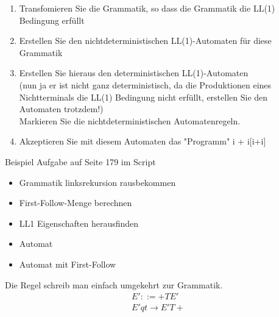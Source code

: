 \documentclass[
  ngerman
  ,12pt
  ,pdftex
]{article}
\begin{document}
\begin{enumerate}
  \item Transfomieren Sie die Grammatik, so dass die Grammatik die LL(1) Bedingung erfüllt
  \item Erstellen Sie den nichtdeterministischen LL(1)-Automaten für diese Grammatik
  \item Erstellen Sie hieraus den deterministischen LL(1)-Automaten\\ (nun ja er ist nicht ganz deterministisch, da die Produktionen eines Nichtterminals die LL(1) Bedingung nicht erfüllt, erstellen Sie den Automaten trotzdem!)\\
  Markieren Sie die nichtdeterministischen Automatenregeln.
  \item Akzeptieren Sie mit diesem Automaten das "Programm" i + i[i+i]
\end{enumerate}
Beispiel Aufgabe auf Seite 179 im Script\\
\begin{itemize}
  \item Grammatik linksrekursion rausbekommen
  \item First-Follow-Menge berechnen 
  \item LL1 Eigenschaften herausfinden
  \item Automat
  \item Automat mit First-Follow
\end{itemize}
Die Regel schreib man einfach umgekehrt zur Grammatik.
\begin{align*}
  E' ::= +TE'\\
  E'qt\longrightarrow E'T+
\end{align*}
\end{document}
